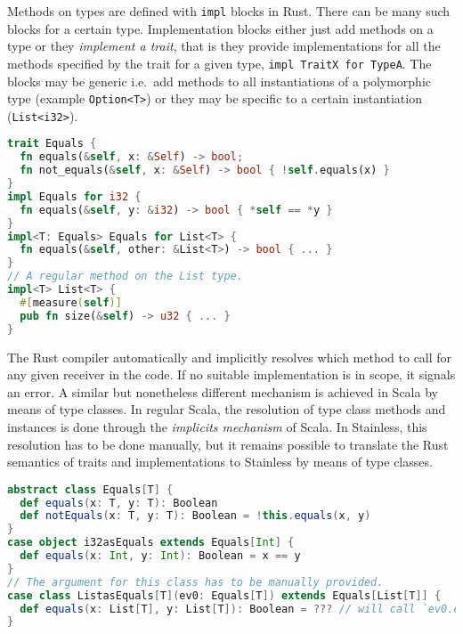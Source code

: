 Methods on types are defined with \passthrough{\lstinline!impl!} blocks
in Rust. There can be many such blocks for a certain type.
Implementation blocks either just add methods on a type or they
\emph{implement a trait}, that is they provide implementations for all
the methods specified by the trait for a given type,
\passthrough{\lstinline!impl TraitX for TypeA!}. The blocks may be
generic i.e.~add methods to all instantiations of a polymorphic type
(example \passthrough{\lstinline!Option<T>!}) or they may be specific to
a certain instantiation (\passthrough{\lstinline!List<i32>!}).

\begin{lstlisting}[language=Rust, caption={Rust trait with two implementations.}]
trait Equals {
  fn equals(&self, x: &Self) -> bool;
  fn not_equals(&self, x: &Self) -> bool { !self.equals(x) }
}
impl Equals for i32 {
  fn equals(&self, y: &i32) -> bool { *self == *y }
}
impl<T: Equals> Equals for List<T> {
  fn equals(&self, other: &List<T>) -> bool { ... }
}
// A regular method on the List type.
impl<T> List<T> {
  #[measure(self)]
  pub fn size(&self) -> u32 { ... }
}
\end{lstlisting}

The Rust compiler automatically and implicitly resolves which method to
call for any given receiver in the code. If no suitable implementation
is in scope, it signals an error. A similar but nonetheless different
mechanism is achieved in Scala by means of type classes. In regular
Scala, the resolution of type class methods and instances is done
through the \emph{implicits mechanism} of Scala. In Stainless, this
resolution has to be done manually, but it remains possible to translate
the Rust semantics of traits and implementations to Stainless by means
of type classes.

\begin{lstlisting}[language=Scala, caption={Type class with implementations in Scala.}]
abstract class Equals[T] {
  def equals(x: T, y: T): Boolean
  def notEquals(x: T, y: T): Boolean = !this.equals(x, y)
}
case object i32asEquals extends Equals[Int] {
  def equals(x: Int, y: Int): Boolean = x == y
}
// The argument for this class has to be manually provided.
case class ListasEquals[T](ev0: Equals[T]) extends Equals[List[T]] {
  def equals(x: List[T], y: List[T]): Boolean = ??? // will call `ev0.equals`
}
\end{lstlisting}

